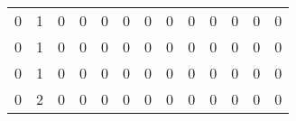 \begin{tabular}{rrrrrrrrrrrrr}
       0 &       1 &          0 &               0 &                0 &       0 &          0 &          0 &         0 &         0 &      0 &             0 &         0 \\
       0 &       1 &          0 &               0 &                0 &       0 &          0 &          0 &         0 &         0 &      0 &             0 &         0 \\
       0 &       1 &          0 &               0 &                0 &       0 &          0 &          0 &         0 &         0 &      0 &             0 &         0 \\
       0 &       2 &          0 &               0 &                0 &       0 &          0 &          0 &         0 &         0 &      0 &             0 &         0 \\
\bottomrule
\end{tabular}

